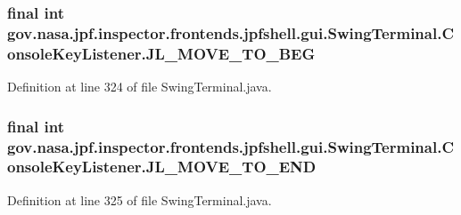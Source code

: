 \subsubsection[{\texorpdfstring{J\+L\+\_\+\+M\+O\+V\+E\+\_\+\+T\+O\+\_\+\+B\+EG}{JL_MOVE_TO_BEG}}]{\setlength{\rightskip}{0pt plus 5cm}final int gov.\+nasa.\+jpf.\+inspector.\+frontends.\+jpfshell.\+gui.\+Swing\+Terminal.\+Console\+Key\+Listener.\+J\+L\+\_\+\+M\+O\+V\+E\+\_\+\+T\+O\+\_\+\+B\+EG\hspace{0.3cm}{\ttfamily [private]}}\hypertarget{classgov_1_1nasa_1_1jpf_1_1inspector_1_1frontends_1_1jpfshell_1_1gui_1_1_swing_terminal_1_1_console_key_listener_ab88f21e9ba0483b37197984b4be3ac1c}{}\label{classgov_1_1nasa_1_1jpf_1_1inspector_1_1frontends_1_1jpfshell_1_1gui_1_1_swing_terminal_1_1_console_key_listener_ab88f21e9ba0483b37197984b4be3ac1c}


Definition at line 324 of file Swing\+Terminal.\+java.

\subsubsection[{\texorpdfstring{J\+L\+\_\+\+M\+O\+V\+E\+\_\+\+T\+O\+\_\+\+E\+ND}{JL_MOVE_TO_END}}]{\setlength{\rightskip}{0pt plus 5cm}final int gov.\+nasa.\+jpf.\+inspector.\+frontends.\+jpfshell.\+gui.\+Swing\+Terminal.\+Console\+Key\+Listener.\+J\+L\+\_\+\+M\+O\+V\+E\+\_\+\+T\+O\+\_\+\+E\+ND\hspace{0.3cm}{\ttfamily [private]}}\hypertarget{classgov_1_1nasa_1_1jpf_1_1inspector_1_1frontends_1_1jpfshell_1_1gui_1_1_swing_terminal_1_1_console_key_listener_a7414f2d8de5af56765142ce28251c3d3}{}\label{classgov_1_1nasa_1_1jpf_1_1inspector_1_1frontends_1_1jpfshell_1_1gui_1_1_swing_terminal_1_1_console_key_listener_a7414f2d8de5af56765142ce28251c3d3}


Definition at line 325 of file Swing\+Terminal.\+java.

